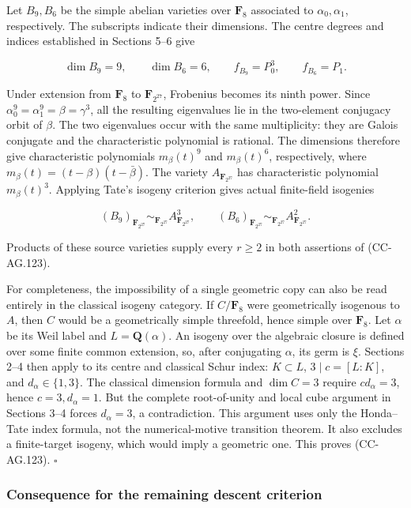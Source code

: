 Let \(B_9,B_6\) be the simple abelian varieties over \(\mathbf F_8\)
associated to \(\alpha_0,\alpha_1\), respectively. The subscripts
indicate their dimensions. The centre degrees and indices established in
Sections 5--6 give

\[
 \dim B_9=9,\qquad \dim B_6=6,\qquad
 f_{B_9}=P_0^3,\qquad f_{B_6}=P_1.
 \tag{CC-AG.124}
\]

Under extension from \(\mathbf F_8\) to \(\mathbf F_{2^{27}}\),
Frobenius becomes its ninth power. Since
\(\alpha_0^9=\alpha_1^9=\beta=\gamma^3\), all the resulting eigenvalues
lie in the two-element conjugacy orbit of \(\beta\). The two eigenvalues
occur with the same multiplicity: they are Galois conjugate and the
characteristic polynomial is rational. The dimensions therefore give
characteristic polynomials \(m_\beta(t)^9\) and \(m_\beta(t)^6\),
respectively, where \(m_\beta(t)=(t-\beta)(t-\bar\beta)\). The variety
\(A_{\mathbf F_{2^{27}}}\) has characteristic polynomial
\(m_\beta(t)^3\). Applying Tate's isogeny criterion gives actual
finite-field isogenies

\[
 (B_9)_{\mathbf F_{2^{27}}}
       \sim_{\mathbf F_{2^{27}}} A_{\mathbf F_{2^{27}}}^{3},
 \qquad
 (B_6)_{\mathbf F_{2^{27}}}
       \sim_{\mathbf F_{2^{27}}} A_{\mathbf F_{2^{27}}}^{2}.
 \tag{CC-AG.125}
\]

Products of these source varieties supply every \(r\ge2\) in both
assertions of (CC-AG.123).

For completeness, the impossibility of a single geometric copy can also
be read entirely in the classical isogeny category. If \(C/\mathbf F_8\)
were geometrically isogenous to \(A\), then \(C\) would be a
geometrically simple threefold, hence simple over \(\mathbf F_8\). Let
\(\alpha\) be its Weil label and \(L=\mathbf Q(\alpha)\). An isogeny
over the algebraic closure is defined over some finite common extension,
so, after conjugating \(\alpha\), its germ is \(\xi\). Sections 2--4
then apply to its centre and classical Schur index: \(K\subset L\),
\(3\mid c=[L:K]\), and \(d_\alpha\in\{1,3\}\). The classical dimension
formula and \(\dim C=3\) require \(c d_\alpha=3\), hence
\(c=3,d_\alpha=1\). But the complete root-of-unity and local cube
argument in Sections 3--4 forces \(d_\alpha=3\), a contradiction. This
argument uses only the Honda--Tate index formula, not the
numerical-motive transition theorem. It also excludes a finite-target
isogeny, which would imply a geometric one. This proves (CC-AG.123).
\(\square\)

\subsubsection{Consequence for the remaining descent
criterion}\label{consequence-for-the-remaining-descent-criterion}

